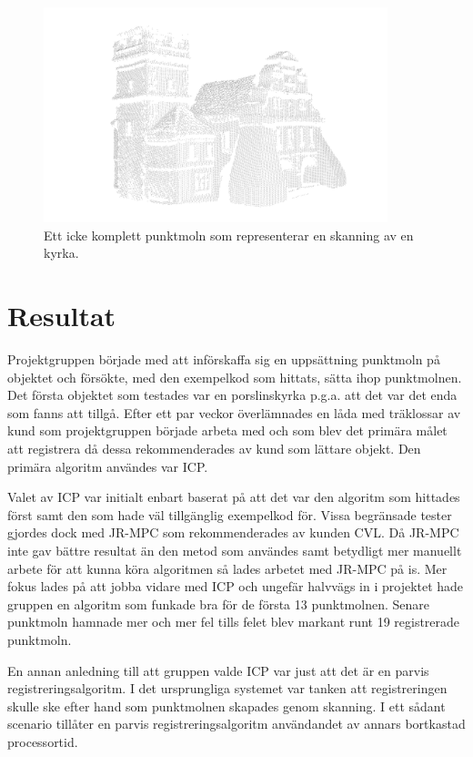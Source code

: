 \begin{figure}[H]
	\centering
	\includegraphics[width=100mm]{figures/icke_komplett_moln_kyrka.png}
	\caption{Ett icke komplett punktmoln som representerar en skanning av en kyrka.}
	\label{fig:karlsson-single_scan-church}
\end{figure}


\section{Resultat}
\label{sec:results-karlsson}

Projektgruppen började med att införskaffa sig en uppsättning punktmoln på objektet och försökte, med den exempelkod som hittats, sätta ihop punktmolnen. Det första objektet som testades var en porslinskyrka p.g.a. att det var det enda som fanns att tillgå. Efter ett par veckor överlämnades en låda med träklossar av kund som projektgruppen började arbeta med och som blev det primära målet att registrera då dessa rekommenderades av kund som lättare objekt. Den primära algoritm användes var ICP. 

Valet av ICP var initialt enbart baserat på att det var den algoritm som hittades först samt den som hade väl tillgänglig exempelkod för. Vissa begränsade tester gjordes dock med JR-MPC som rekommenderades av kunden CVL. Då JR-MPC inte gav bättre resultat än den metod som användes samt betydligt mer manuellt arbete för att kunna köra algoritmen så lades arbetet med JR-MPC på is. Mer fokus lades på att jobba vidare med ICP och ungefär halvvägs in i projektet hade gruppen en algoritm som funkade bra för de första 13 punktmolnen. Senare punktmoln hamnade mer och mer fel tills felet blev markant runt 19 registrerade punktmoln. 

En annan anledning till att gruppen valde ICP var just att det är en parvis registreringsalgoritm. I det ursprungliga systemet var tanken att registreringen skulle ske efter hand som punktmolnen skapades genom skanning. I ett sådant scenario tillåter en parvis registreringsalgoritm användandet av annars bortkastad processortid.



